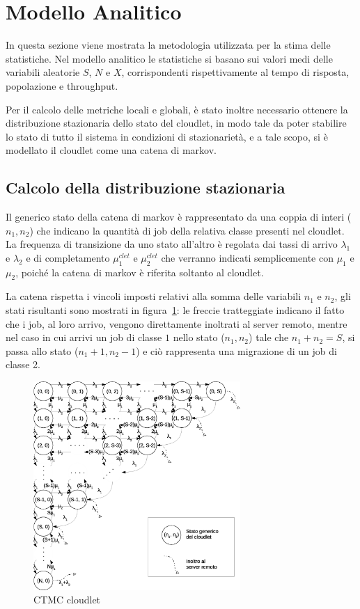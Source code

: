 \section{Modello Analitico}
In questa sezione viene mostrata la metodologia utilizzata per la stima delle
statistiche.  Nel modello analitico le statistiche si basano sui valori medi
delle variabili aleatorie $S$, $N$ e $X$, corrispondenti rispettivamente al
tempo di risposta, popolazione e throughput.

Per il calcolo delle metriche locali e globali, è stato inoltre necessario
ottenere la distribuzione stazionaria dello stato del cloudlet, in modo tale da
poter stabilire lo stato di tutto il sistema in condizioni di stazionarietà, e a
tale scopo, si è modellato il cloudlet come una catena di markov.
%
\subsection{Calcolo della distribuzione stazionaria}
Il generico stato della catena di markov è rappresentato da una coppia di interi
($n_1, n_2$) che indicano la quantità di job della relativa classe presenti nel
cloudlet.\\
La frequenza di transizione da uno stato all'altro è regolata dai tassi di
arrivo $\lambda_1$ e $\lambda_2$ e di completamento $\mu_1^{clet}$ e
$\mu_2^{clet}$ che verranno indicati semplicemente con $\mu_1$ e $\mu_2$, poiché
la catena di markov è riferita soltanto al cloudlet.

La catena rispetta i vincoli imposti relativi alla somma delle variabili $n_1$ e
$n_2$, gli stati risultanti sono mostrati in figura~\ref{ctmc}: le freccie
tratteggiate indicano il fatto che i job, al loro arrivo, vengono direttamente
inoltrati al server remoto, mentre nel caso in cui arrivi un job di classe $1$
nello stato ($n_1, n_2$) tale che $n_1+n_2=S$, si passa allo stato ($n_1+1,
n_2-1$) e ciò rappresenta una migrazione di un job di classe 2.
%
\begin{figure}[!h]
\centering
\includegraphics[width=0.7\textwidth]{figures/ctmc}
\caption{CTMC cloudlet}
\label{ctmc}
\end{figure}
%

